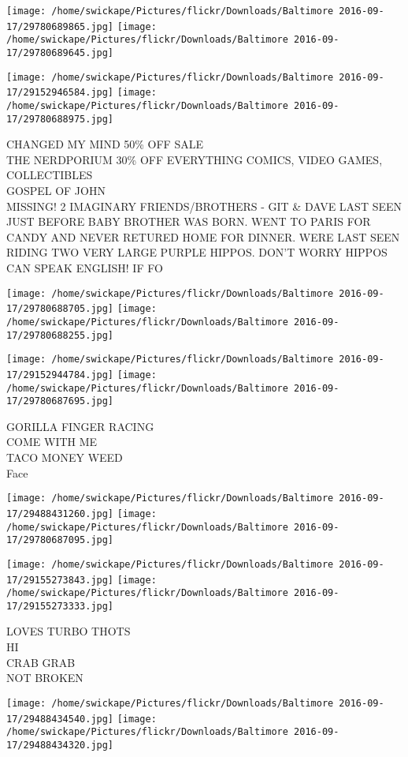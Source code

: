 \documentclass[10pt,letterpaper]{article}
\begin{document}
\texttt{[image: /home/swickape/Pictures/flickr/Downloads/Baltimore 2016-09-17/29780689865.jpg]}
\texttt{[image: /home/swickape/Pictures/flickr/Downloads/Baltimore 2016-09-17/29780689645.jpg]}

\texttt{[image: /home/swickape/Pictures/flickr/Downloads/Baltimore 2016-09-17/29152946584.jpg]}
\texttt{[image: /home/swickape/Pictures/flickr/Downloads/Baltimore 2016-09-17/29780688975.jpg]}

CHANGED MY MIND 50\% OFF SALE\\
THE NERDPORIUM 30\% OFF EVERYTHING COMICS, VIDEO GAMES, COLLECTIBLES\\
GOSPEL OF JOHN\\
MISSING!  2 IMAGINARY FRIENDS/BROTHERS {-} GIT \& DAVE LAST SEEN JUST BEFORE BABY BROTHER WAS BORN.  WENT TO PARIS FOR CANDY AND NEVER RETURED HOME FOR DINNER.  WERE LAST SEEN RIDING TWO VERY LARGE PURPLE HIPPOS.  DON'T WORRY HIPPOS CAN SPEAK ENGLISH!  IF FO
\pagebreak

\texttt{[image: /home/swickape/Pictures/flickr/Downloads/Baltimore 2016-09-17/29780688705.jpg]}
\texttt{[image: /home/swickape/Pictures/flickr/Downloads/Baltimore 2016-09-17/29780688255.jpg]}

\texttt{[image: /home/swickape/Pictures/flickr/Downloads/Baltimore 2016-09-17/29152944784.jpg]}
\texttt{[image: /home/swickape/Pictures/flickr/Downloads/Baltimore 2016-09-17/29780687695.jpg]}

GORILLA FINGER RACING\\
COME WITH ME\\
TACO MONEY WEED\\
Face
\pagebreak

\texttt{[image: /home/swickape/Pictures/flickr/Downloads/Baltimore 2016-09-17/29488431260.jpg]}
\texttt{[image: /home/swickape/Pictures/flickr/Downloads/Baltimore 2016-09-17/29780687095.jpg]}

\texttt{[image: /home/swickape/Pictures/flickr/Downloads/Baltimore 2016-09-17/29155273843.jpg]}
\texttt{[image: /home/swickape/Pictures/flickr/Downloads/Baltimore 2016-09-17/29155273333.jpg]}

LOVES TURBO THOTS\\
HI\\
CRAB GRAB\\
NOT BROKEN
\pagebreak

\texttt{[image: /home/swickape/Pictures/flickr/Downloads/Baltimore 2016-09-17/29488434540.jpg]}
\texttt{[image: /home/swickape/Pictures/flickr/Downloads/Baltimore 2016-09-17/29488434320.jpg]}
\end{document}

